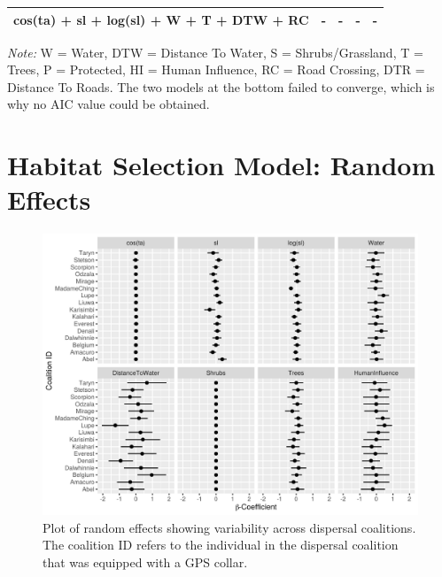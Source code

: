\documentclass[abstract=off,10pt,a4paper,bibliography=totocnumbered]{article}
\begin{document}
\begin{table}[hbpt]
\begin{center}
{\begin{threeparttable}
\begin{tabular}{lllll}
          cos(ta) + sl + log(sl) + W + T + DTW + RC & - & - & - & - \\
         \bottomrule
       \end{tabular}
       \begin{tablenotes}
         \item \textit{Note:} W = Water, DTW = Distance To Water, S =
         Shrubs/Grassland, T = Trees, P = Protected, HI = Human Influence, RC =
         Road Crossing, DTR = Distance To Roads. The two models at the bottom
         failed to converge, which is why no AIC value could be obtained.
       \end{tablenotes}
     \end{threeparttable}
    }
  \end{center}
\end{table}

\newpage
\section{Habitat Selection Model: Random Effects}
\begin{figure}[hbtp]
  \includegraphics[width = \textwidth]{99_RandomEffects}
  \caption{Plot of random effects showing variability across dispersal
  coalitions. The coalition ID refers to the individual in the dispersal
  coalition that was equipped with a GPS collar.}
  \label{RandomEffects}
\end{figure}
\end{document}
